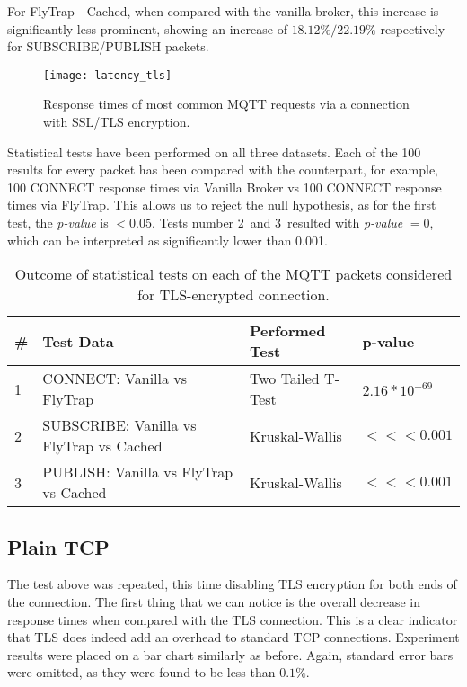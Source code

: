 For FlyTrap - Cached, when compared with the vanilla broker, this increase is significantly less prominent, showing an increase of $18.12\%/22.19\%$ respectively for SUBSCRIBE/PUBLISH packets. 
\begin{figure}[h]
    \centering
    \texttt{[image: latency\_tls]}
    \caption{Response times of most common MQTT requests via a connection with SSL/TLS encryption.}
    \label{fig:latency_tls}
\end{figure}

Statistical tests have been performed on all three datasets. Each of the 100 results for every packet has been compared with the counterpart, for example, 100 CONNECT response times via Vanilla Broker vs 100 CONNECT response times via FlyTrap. This allows us to reject the null hypothesis, as for the first test, the \textit{p-value} is $<0.05$. Tests number 2\ and 3\ resulted with \textit{p-value} $=0$, which can be interpreted as significantly lower than 0.001.

\begin{table}[h]
\centering
\begin{tabular}{|l|l|l|l|}
\hline
\textbf{\#} & \textbf{Test Data}                       & \textbf{Performed Test} & \textbf{p-value}                      \\ \hline
1           & CONNECT: Vanilla vs FlyTrap              & Two Tailed T-Test       & $2.16*10^{-69}$                    \\ \hline
2           & SUBSCRIBE: Vanilla vs FlyTrap vs Cached & Kruskal-Wallis          & $<<< 0.001$ \\ \hline
3           & PUBLISH: Vanilla vs FlyTrap vs Cached & Kruskal-Wallis          & $<<< 0.001$ \\ \hline
\end{tabular}
\caption{Outcome of statistical tests on each of the MQTT packets considered for TLS-encrypted connection.}
\label{tab:ttest-tls}
\end{table}

\subsection{Plain TCP}
The test above was repeated, this time disabling TLS encryption for both ends of the connection. The first thing that we can notice is the overall decrease in response times when compared with the TLS connection. This is a clear indicator that TLS does indeed add an overhead to standard TCP connections. Experiment results were placed on a bar chart similarly as before. Again, standard error bars were omitted, as they were found to be less than $0.1\%$.

